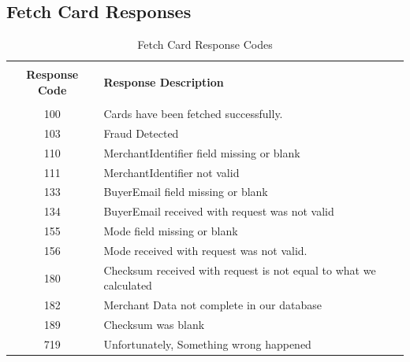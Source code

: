 \documentclass{article}
\begin{document}
\subsection{Fetch Card Responses}
\begin{longtable}{||c|p{12.5cm}||}
\rowcolor{white}
    \caption{Fetch Card Response Codes}\\
    \rowcolor{green!50}
\bfseries{Response Code} & \bfseries{Response Description} \\ \hline  & \\
100 & Cards have been fetched successfully.  \\
103 & Fraud Detected  \\
110 & MerchantIdentifier field missing or blank  \\
111 & MerchantIdentifier not valid  \\
133 & BuyerEmail field missing or blank  \\
134 & BuyerEmail received with request was not valid  \\
155 & Mode field missing or blank  \\
156 & Mode received with request was not valid.  \\
180 & Checksum received with request is not equal to what we calculated  \\
182 & Merchant Data not complete in our database  \\
189 & Checksum was blank  \\
719 & Unfortunately, Something wrong happened  \\
\end{longtable}
\end{document}
